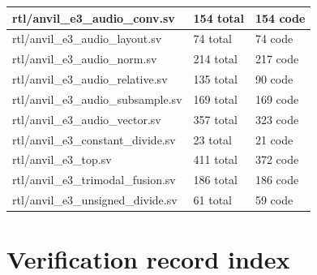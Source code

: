 \documentclass[11pt,a4paper]{article}
\begin{document}
{\begin{longtable}{@{}L{0.55\textwidth}|L{0.18\textwidth}|L{0.18\textwidth}@{}}
rtl/\allowbreak{}anvil\_\allowbreak{}e3\_\allowbreak{}audio\_\allowbreak{}conv.sv & 154 total & 154 code\\[2pt]\hline

rtl/\allowbreak{}anvil\_\allowbreak{}e3\_\allowbreak{}audio\_\allowbreak{}layout.sv & 74 total & 74 code\\[2pt]\hline

rtl/\allowbreak{}anvil\_\allowbreak{}e3\_\allowbreak{}audio\_\allowbreak{}norm.sv & 214 total & 217 code\\[2pt]\hline

rtl/\allowbreak{}anvil\_\allowbreak{}e3\_\allowbreak{}audio\_\allowbreak{}relative.sv & 135 total & 90 code\\[2pt]\hline

rtl/\allowbreak{}anvil\_\allowbreak{}e3\_\allowbreak{}audio\_\allowbreak{}subsample.sv & 169 total & 169 code\\[2pt]\hline

rtl/\allowbreak{}anvil\_\allowbreak{}e3\_\allowbreak{}audio\_\allowbreak{}vector.sv & 357 total & 323 code\\[2pt]\hline

rtl/\allowbreak{}anvil\_\allowbreak{}e3\_\allowbreak{}constant\_\allowbreak{}divide.sv & 23 total & 21 code\\[2pt]\hline

rtl/\allowbreak{}anvil\_\allowbreak{}e3\_\allowbreak{}top.sv & 411 total & 372 code\\[2pt]\hline

rtl/\allowbreak{}anvil\_\allowbreak{}e3\_\allowbreak{}trimodal\_\allowbreak{}fusion.sv & 186 total & 186 code\\[2pt]\hline

rtl/\allowbreak{}anvil\_\allowbreak{}e3\_\allowbreak{}unsigned\_\allowbreak{}divide.sv & 61 total & 59 code\\[2pt]\hline

\bottomrule\end{longtable}}

\section{Verification record index}
\end{document}
